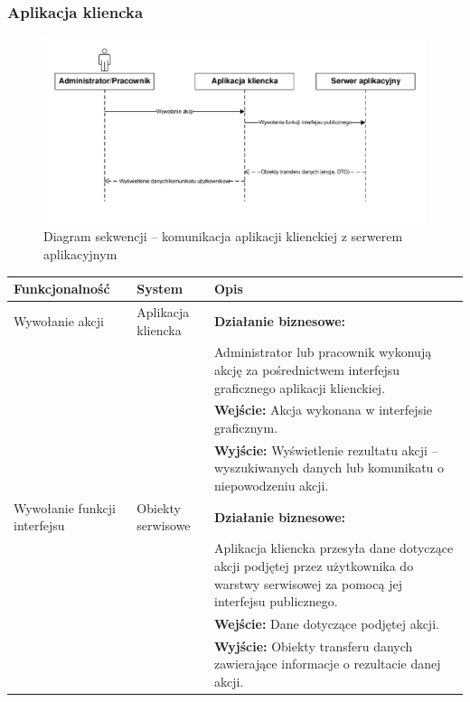 \documentclass[10pt,a4paper]{article}
\begin{document}
\subsubsection{Aplikacja kliencka}
\begin{figure}[H]
	\includegraphics[width=16cm]{Resources/PDF/sequence-client.pdf}
	\caption{Diagram sekwencji -- komunikacja aplikacji klienckiej z serwerem aplikacyjnym}
\end{figure}
\begin{table}[H]
	\begin{tabularx}{\textwidth}{|l|l|X|}
		\hline
		\textbf{Funkcjonalność} & \textbf{System} & \textbf{Opis} \\
		\hline
		Wywołanie akcji &
		Aplikacja kliencka &
		\textbf{Działanie biznesowe:} \\
		& & Administrator lub pracownik wykonują akcję za pośrednictwem interfejsu graficznego aplikacji klienckiej. \\
		& & \textbf{Wejście:} Akcja wykonana w interfejsie graficznym. \\
		& & \textbf{Wyjście:} Wyświetlenie rezultatu akcji -- wyszukiwanych danych lub komunikatu o niepowodzeniu akcji. \\
		\hline
		Wywołanie funkcji interfejsu &
		Obiekty serwisowe &
		\textbf{Działanie biznesowe:} \\
		& & Aplikacja kliencka przesyła dane dotyczące akcji podjętej przez użytkownika do warstwy serwisowej za pomocą jej interfejsu publicznego. \\
		& & \textbf{Wejście:} Dane dotyczące podjętej akcji. \\
		& & \textbf{Wyjście:} Obiekty transferu danych zawierające informacje o rezultacie danej akcji. \\
		\hline
	\end{tabularx}
\end{table}
\end{document}
